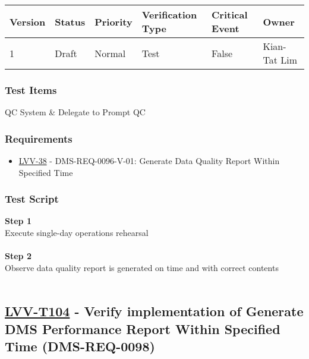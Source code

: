 \begin{longtable}[]{@{}llllll@{}}
\toprule
Version & Status & Priority & Verification Type & Critical Event &
Owner\tabularnewline
\midrule
\endhead
1 & Draft & Normal & Test & False & Kian-Tat Lim\tabularnewline
\bottomrule
\end{longtable}

\hypertarget{test-items-3}{%
\subsubsection{Test Items}\label{test-items-3}}

QC System \& Delegate to Prompt QC

\hypertarget{requirements-3}{%
\subsubsection{Requirements}\label{requirements-3}}

\begin{itemize}
\tightlist
\item
  \href{https://jira.lsstcorp.org/browse/LVV-38}{LVV-38} -
  DMS-REQ-0096-V-01: Generate Data Quality Report Within Specified Time
\end{itemize}

\hypertarget{test-script-3}{%
\subsubsection{Test Script}\label{test-script-3}}

\textbf{Step 1}\\
Execute single-day operations rehearsal\\
~\\
\textbf{Step 2}\\
Observe data quality report is generated on time and with correct
contents\\
~\\

\hypertarget{lvv-t104---verify-implementation-of-generate-dms-performance-report-within-specified-time-dms-req-0098}{%
\subsection{\texorpdfstring{\href{https://jira.lsstcorp.org/secure/Tests.jspa\#/testCase/LVV-T104}{LVV-T104}
- Verify implementation of Generate DMS Performance Report Within
Specified Time
(DMS-REQ-0098)}{LVV-T104 - Verify implementation of Generate DMS Performance Report Within Specified Time (DMS-REQ-0098)}}\label{lvv-t104---verify-implementation-of-generate-dms-performance-report-within-specified-time-dms-req-0098}}


